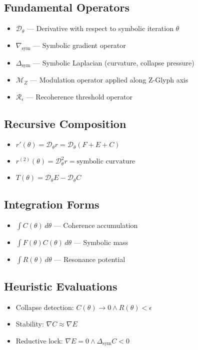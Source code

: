 \documentclass[12pt]{article}
\begin{document}
\subsection*{Fundamental Operators}
\begin{itemize}
  \item $\mathcal{D}_\theta$ — Derivative with respect to symbolic iteration $\theta$
  \item $\nabla_{\text{sym}}$ — Symbolic gradient operator
  \item $\Delta_{\text{sym}}$ — Symbolic Laplacian (curvature, collapse pressure)
  \item $\mathcal{M}_Z$ — Modulation operator applied along Z-Glyph axis
  \item $\mathcal{R}_\epsilon$ — Recoherence threshold operator
\end{itemize}

\subsection*{Recursive Composition}
\begin{itemize}
  \item $r'(\theta) = \mathcal{D}_\theta r = \mathcal{D}_\theta (F + E + C)$
  \item $r^{(2)}(\theta) = \mathcal{D}^2_\theta r = \text{symbolic curvature}$
  \item $T(\theta) = \mathcal{D}_\theta E - \mathcal{D}_\theta C$
\end{itemize}

\subsection*{Integration Forms}
\begin{itemize}
  \item $\int C(\theta) \, d\theta$ — Coherence accumulation
  \item $\int F(\theta) C(\theta) \, d\theta$ — Symbolic mass
  \item $\int R(\theta) \, d\theta$ — Resonance potential
\end{itemize}

\subsection*{Heuristic Evaluations}
\begin{itemize}
  \item Collapse detection: $C(\theta) \to 0 \land R(\theta) < \epsilon$
  \item Stability: $\nabla C \approx \nabla E$
  \item Reductive lock: $\nabla E = 0 \land \Delta_{\text{sym}} C < 0$
\end{itemize}
\end{document}
